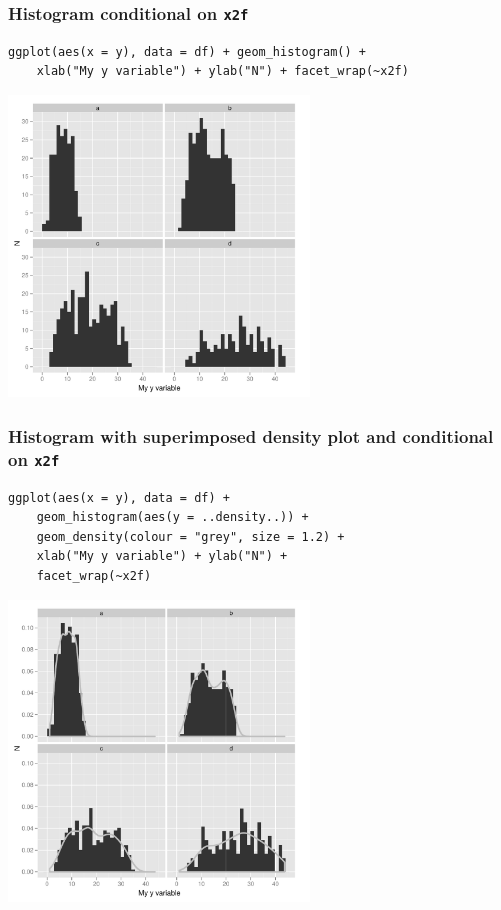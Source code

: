 \documentclass[bigger]{beamer}
\begin{document}
\begin{frame}[fragile]
\frametitle{Histogram conditional on \texttt{x2f}}
\label{sec-3_3}


\lstset{language=R}
\begin{lstlisting}
ggplot(aes(x = y), data = df) + geom_histogram() + 
    xlab("My y variable") + ylab("N") + facet_wrap(~x2f)
\end{lstlisting}



\includegraphics[width=0.6\textwidth]{../graphs/ggplot2_hist_g.pdf}
\end{frame}
\begin{frame}[fragile,shrink = 10]
\frametitle{Histogram with superimposed density plot and conditional on \texttt{x2f}}
\label{sec-3_4}

\lstset{language=R}
\begin{lstlisting}
ggplot(aes(x = y), data = df) + 
    geom_histogram(aes(y = ..density..)) + 
    geom_density(colour = "grey", size = 1.2) + 
    xlab("My y variable") + ylab("N") + 
    facet_wrap(~x2f)
\end{lstlisting}



\includegraphics[width=0.6\textwidth]{../graphs/ggplot2_hist_dens.pdf}
\end{frame}
\end{document}
